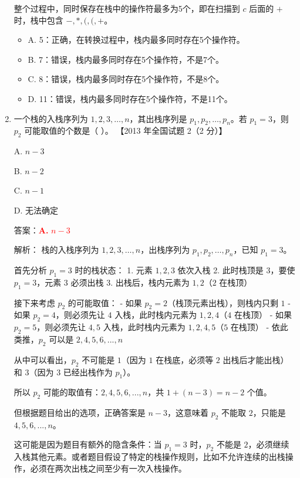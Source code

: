 \documentclass[lang=cn,newtx,10pt,scheme=chinese]{../../../elegantbook}
\begin{document}
\begin{enumerate}
    整个过程中，同时保存在栈中的操作符最多为5个，即在扫描到 $c$ 后面的 $+$ 时，栈中包含 $-,*,(,(,+$。

    \begin{itemize}
        \item A. 5：正确，在转换过程中，栈内最多同时存在5个操作符。
        \item B. 7：错误，栈内最多同时存在5个操作符，不是7个。
        \item C. 8：错误，栈内最多同时存在5个操作符，不是8个。
        \item D. 11：错误，栈内最多同时存在5个操作符，不是11个。
    \end{itemize}

    \item 一个栈的入栈序列为 $1, 2, 3, \ldots, n$，其出栈序列是 $p_1, p_2, \ldots, p_n$。若 $p_1 = 3$，则 $p_2$ 可能取值的个数是（ ）。  
    【2013 年全国试题 2（2 分）】 

    A. $n-3$  

    B. $n-2$  

    C. $n-1$  

    D. 无法确定  

    答案：\textcolor{red}{\textbf{A.} $n-3$}

    解析：
    栈的入栈序列为 $1, 2, 3, \ldots, n$，出栈序列为 $p_1, p_2, \ldots, p_n$，已知 $p_1 = 3$。

    首先分析 $p_1 = 3$ 时的栈状态：
    1. 元素 $1, 2, 3$ 依次入栈
    2. 此时栈顶是 $3$，要使 $p_1 = 3$，元素 $3$ 必须出栈
    3. 出栈后，栈内元素为 $1, 2$（$2$ 在栈顶）

    接下来考虑 $p_2$ 的可能取值：
    - 如果 $p_2 = 2$（栈顶元素出栈），则栈内只剩 $1$
    - 如果 $p_2 = 4$，则必须先让 $4$ 入栈，此时栈内元素为 $1, 2, 4$（$4$ 在栈顶）
    - 如果 $p_2 = 5$，则必须先让 $4, 5$ 入栈，此时栈内元素为 $1, 2, 4, 5$（$5$ 在栈顶）
    - 依此类推，$p_2$ 可以是 $2, 4, 5, 6, ..., n$

    从中可以看出，$p_2$ 不可能是 $1$（因为 $1$ 在栈底，必须等 $2$ 出栈后才能出栈）和 $3$（因为 $3$ 已经出栈作为 $p_1$）。

    所以 $p_2$ 可能的取值有：$2, 4, 5, 6, ..., n$，共 $1 + (n-3) = n-2$ 个值。

    但根据题目给出的选项，正确答案是 $n-3$，这意味着 $p_2$ 不能取 $2$，只能是 $4, 5, 6, ..., n$。

    这可能是因为题目有额外的隐含条件：当 $p_1 = 3$ 时，$p_2$ 不能是 $2$，必须继续入栈其他元素。或者题目假设了特定的栈操作规则，比如不允许连续的出栈操作，必须在两次出栈之间至少有一次入栈操作。


\end{enumerate}
\end{document}
